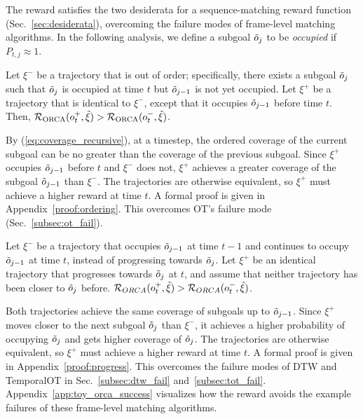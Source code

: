 The \ours{} reward satisfies the two desiderata for a sequence-matching reward function (Sec.~\ref{sec:desiderata}), overcoming the failure modes of frame-level matching algorithms. In the following analysis, we define a subgoal $\tilde{o}_{j}$ to be \textit{occupied} if $P_{t, j} \approx 1$.

\begin{proposition}
Let $\xi^{-}$ be a trajectory that is out of order; specifically, there exists a subgoal $\tilde{o}_{j}$ such that $\tilde{o}_{j}$ is occupied at time $t$ but $\tilde{o}_{j-1}$ is not yet occupied. Let $\xi^{+}$ be a trajectory that is identical to $\xi^{-}$, except that it occupies $\tilde{o}_{j-1}$ before time $t$. Then, $\mathcal{R}_{\text{ORCA}}(o^{+}_t, \tilde{\xi}) > \mathcal{R}_{\text{ORCA}}(o^{-}_t, \tilde{\xi})$.
 
 \label{prop:ordering}
\end{proposition}

By (\ref{eq:coverage_recursive}), at a timestep, the ordered coverage of the current subgoal can be no greater than the coverage of the previous subgoal. Since $\xi^{+}$ occupies $\tilde{o}_{j-1}$ before $t$ and $\xi^{-}$ does not, $\xi^{+}$ achieves a greater coverage of the subgoal $\tilde{o}_{j-1}$ than $\xi^{-}$. The trajectories are otherwise equivalent, so $\xi^{+}$ must achieve a higher \orca{} reward at time $t$. A formal proof is given in Appendix~\ref{proof:ordering}. This overcomes OT's failure mode (Sec.~\ref{subsec:ot_fail}).

\begin{proposition}
Let $\xi^{-}$ be a trajectory that occupies $\tilde{o}_{j-1}$ at time $t-1$ and continues to occupy $\tilde{o}_{j-1}$ at time $t$, instead of progressing towards $\tilde{o}_{j}$. Let $\xi^{+}$ be an identical trajectory that progresses towards $\tilde{o}_{j}$ at $t$, and assume that neither trajectory has been closer to $\tilde{o}_{j}$ before. $\mathcal{R}_{ORCA}(o^{+}_t, \tilde{\xi}) > \mathcal{R}_{ORCA}(o^{-}_t, \tilde{\xi})$.
\label{prop:progress}
\end{proposition}
Both trajectories achieve the same coverage of subgoals up to $\tilde{o}_{j-1}$. Since $\xi^{+}$ moves closer to the next subgoal $\tilde{o}_{j}$ than $\xi^{-}$, it achieves a higher probability of occupying $\tilde{o}_{j}$ and gets higher coverage of $\tilde{o}_{j}$. The trajectories are otherwise equivalent, so $\xi^{+}$ must achieve a higher \orca{} reward at time $t$. A formal proof is given in Appendix~\ref{proof:progress}. This overcomes the failure modes of DTW and TemporalOT in Sec.~\ref{subsec:dtw_fail} and~\ref{subsec:tot_fail}. Appendix~\ref{app:toy_orca_success} visualizes how the \ours{} reward avoids the example failures of these frame-level matching algorithms. 
